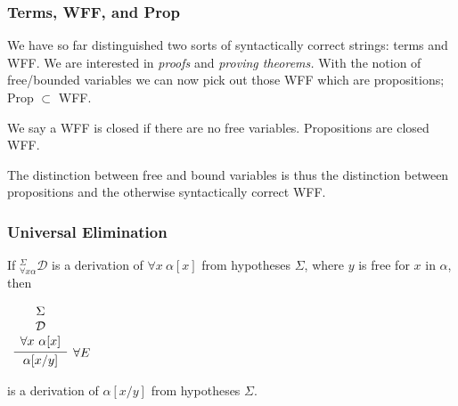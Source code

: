 \documentclass{beamer}
\theoremstyle{indentDefn} \newtheorem{defn}[]{Definition}
\begin{document}
\begin{frame}
	\frametitle{Terms, WFF, and Prop}
	
	We have so far distinguished two sorts of syntactically correct strings: terms and WFF. We are interested in \emph{proofs} and \emph{proving theorems.} With the notion of free/bounded variables we can now pick out those WFF which are propositions; Prop $\subset$ WFF. 
	
	\vspace{2mm}
	
	We say a WFF is closed if there are no free variables. Propositions are closed WFF. 
	
	\vspace{2mm}
	
	The distinction between free and bound variables is thus the distinction between propositions and the otherwise syntactically correct WFF. 
	
	\vspace{50mm}

\end{frame}


\begin{frame}
	\frametitle{Universal Elimination}
	
	If $^{\Sigma}_{\forall x \alpha}\mathcal{D}$ is a derivation of $\forall x \ \alpha[x]$ from hypotheses $\Sigma$, where $y$ is free for $x$ in $\alpha$, then
	
	\vspace{0.5cm}
	
	\begin{center}
		$\begin{array}{c}
		\infer[\forall E]{\alpha[x/y]}{\begin{array}{c} 
			\Sigma \\
			\mathcal{D} \\ 
			\forall x \ \alpha[x]			
			\end{array}}
		\end{array}$
	\end{center}
	
	is a derivation of $\alpha[x/y]$ from hypotheses $\Sigma$. 
	
\end{frame}
\end{document}
